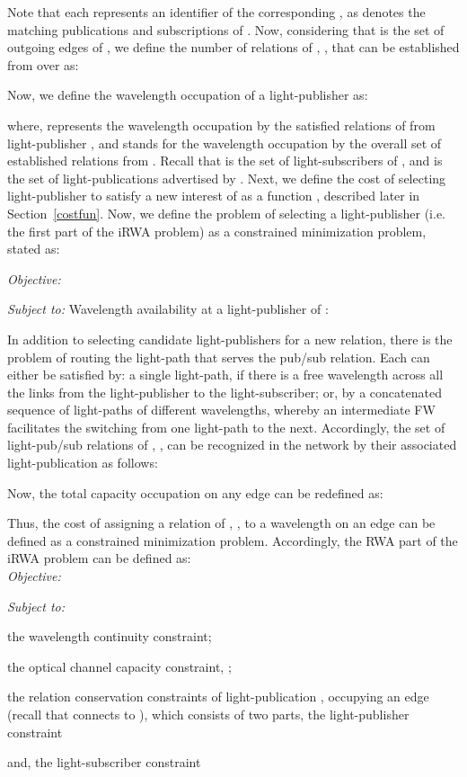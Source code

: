 \documentclass[journal]{IEEEtran}
\begin{document}
Note that each  represents an identifier of the corresponding , as  denotes the matching publications and subscriptions of .
Now, considering that  is the set of outgoing edges of , we define the number of relations of , , that can be established from  over  as:

 Now, we define the wavelength occupation of a light-publisher  as:
 
where,  represents the wavelength occupation by the satisfied relations of  from light-publisher , and  stands for the wavelength occupation by the overall set of established relations from . Recall that  is the set of light-subscribers of , and  is the set of light-publications advertised by .
 Next, we define the cost of selecting light-publisher  to satisfy a new interest of  as a function , described later in Section~\ref{costfun}. Now, we define the problem of selecting a light-publisher (i.e. the first part of the iRWA problem) as a constrained minimization problem, stated as:

 \emph{Objective:}
 
 \emph{Subject to:} Wavelength availability at a light-publisher of :


In addition to selecting candidate light-publishers for a new
relation, there is the problem of routing the light-path that serves the pub/sub relation. Each  can either be satisfied by: a single light-path, if there is a free wavelength across all the links from the light-publisher to the light-subscriber; or, by a concatenated sequence of light-paths of different wavelengths, whereby an intermediate FW facilitates the switching from one light-path to the next. Accordingly, the set of light-pub/sub relations of , , can be recognized in the network by their associated light-publication  as follows:

Now, the total capacity occupation on any edge  can be redefined as:

Thus, the cost of assigning a relation of , , to a wavelength  on an edge  can be defined as a constrained minimization problem. Accordingly, the RWA part of the iRWA problem can be defined as:\\
\emph{Objective:}

\emph{Subject to:}
\begin{inparaenum}
	\item the wavelength continuity constraint;
	\item the optical channel capacity constraint,  ;
	\item the relation conservation constraints of
          light-publication , occupying an edge  (recall that
           connects  to ), which consists of two
          parts, the light-publisher constraint
		
		and, the light-subscriber constraint
		
\end{inparaenum}
\end{document}
